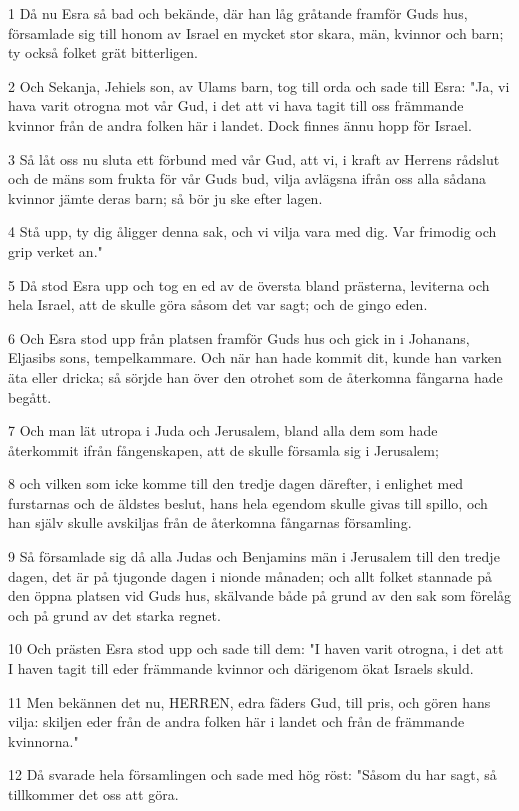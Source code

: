 \par 1 Då nu Esra så bad och bekände, där han låg gråtande framför Guds hus, församlade sig till honom av Israel en mycket stor skara, män, kvinnor och barn; ty också folket grät bitterligen.
\par 2 Och Sekanja, Jehiels son, av Ulams barn, tog till orda och sade till Esra: "Ja, vi hava varit otrogna mot vår Gud, i det att vi hava tagit till oss främmande kvinnor från de andra folken här i landet. Dock finnes ännu hopp för Israel.
\par 3 Så låt oss nu sluta ett förbund med vår Gud, att vi, i kraft av Herrens rådslut och de mäns som frukta för vår Guds bud, vilja avlägsna ifrån oss alla sådana kvinnor jämte deras barn; så bör ju ske efter lagen.
\par 4 Stå upp, ty dig åligger denna sak, och vi vilja vara med dig. Var frimodig och grip verket an."
\par 5 Då stod Esra upp och tog en ed av de översta bland prästerna, leviterna och hela Israel, att de skulle göra såsom det var sagt; och de gingo eden.
\par 6 Och Esra stod upp från platsen framför Guds hus och gick in i Johanans, Eljasibs sons, tempelkammare. Och när han hade kommit dit, kunde han varken äta eller dricka; så sörjde han över den otrohet som de återkomna fångarna hade begått.
\par 7 Och man lät utropa i Juda och Jerusalem, bland alla dem som hade återkommit ifrån fångenskapen, att de skulle församla sig i Jerusalem;
\par 8 och vilken som icke komme till den tredje dagen därefter, i enlighet med furstarnas och de äldstes beslut, hans hela egendom skulle givas till spillo, och han själv skulle avskiljas från de återkomna fångarnas församling.
\par 9 Så församlade sig då alla Judas och Benjamins män i Jerusalem till den tredje dagen, det är på tjugonde dagen i nionde månaden; och allt folket stannade på den öppna platsen vid Guds hus, skälvande både på grund av den sak som förelåg och på grund av det starka regnet.
\par 10 Och prästen Esra stod upp och sade till dem: "I haven varit otrogna, i det att I haven tagit till eder främmande kvinnor och därigenom ökat Israels skuld.
\par 11 Men bekännen det nu, HERREN, edra fäders Gud, till pris, och gören hans vilja: skiljen eder från de andra folken här i landet och från de främmande kvinnorna."
\par 12 Då svarade hela församlingen och sade med hög röst: "Såsom du har sagt, så tillkommer det oss att göra.
